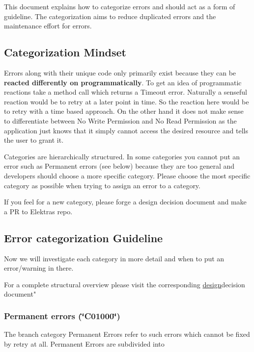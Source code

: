 This document explains how to categorize errors and should act as a form of guideline. The categorization aims to reduce duplicated errors and the maintenance effort for errors.

\subsection*{Categorization Mindset}

Errors along with their unique code only primarily exist because they can be {\bfseries reacted differently on programmatically}. To get an idea of programmatic reactions take a method call which returns a {\ttfamily Timeout} error. Naturally a senseful reaction would be to retry at a later point in time. So the reaction here would be to retry with a time based approach. On the other hand it does not make sense to differentiate between {\ttfamily No Write Permission} and {\ttfamily No Read Permission} as the application just knows that it simply cannot access the desired resource and tells the user to grant it.

Categories are hierarchically structured. In some categories you cannot put an error such as {\ttfamily Permanent errors} (see below) because they are too general and developers should choose a more specific category. Please choose the most specific category as possible when trying to assign an error to a category.

If you feel for a new category, please forge a design decision document and make a PR to Elektra\textquotesingle{}s repo.

\subsection*{Error categorization Guideline}

Now we will investigate each category in more detail and when to put an error/warning in there.

For a complete structural overview please visit the corresponding \hyperlink{doc_decisions_error_codes_md}{design}decision document"

\subsubsection*{Permanent errors (\char`\"{}\+C01000\char`\"{})}

The branch category {\ttfamily Permanent Errors} refer to such errors which cannot be fixed by retry at all. {\ttfamily Permanent Errors} are subdivided into


